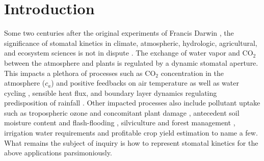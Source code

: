 \documentclass[utf8]{frontiersSCNS} %
\begin{document}
\section{Introduction}
Some two centuries after the original experiments of Francis Darwin \citep{darwin1898ix,scarth1927stomatal}, the significance of stomatal kinetics in climate, atmospheric, hydrologic, agricultural, and ecosystem sciences is not in dispute \citep{hetherington2003role}.  The exchange of water vapor and CO$_2$ between the atmosphere and plants is regulated by a dynamic stomatal aperture. This impacts a plethora of processes such as CO$_2$ concentration in the atmosphere ($c_a$) and positive feedbacks on air temperature \citep{cox2000acceleration} as well as water cycling \citep{betts2007projected,katul2012evapotranspiration}, sensible heat flux, and boundary layer dynamics regulating predisposition of rainfall \citep{siqueira2009soil, manoli2016soil}. Other impacted processes also include pollutant uptake such as tropospheric ozone and concomitant plant damage \citep{rich1964ozone,musselman2006critical}, antecedent soil moisture content and flash-flooding \citep{javelle2010flash}, silviculture and forest management \citep{makela1986stand}, irrigation water requirements and profitable crop yield estimation \citep{vico2015ecohydrology} to name a few.  What remains the subject of inquiry is how to represent stomatal kinetics for the above applications parsimoniously. 
\end{document}
